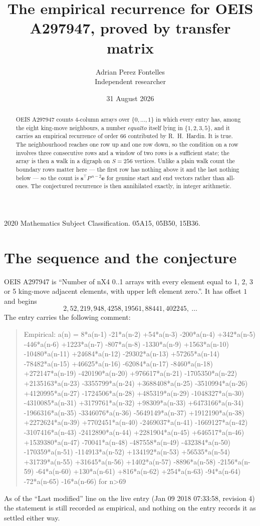 \documentclass[11pt,a4paper]{article}
\title{The empirical recurrence for OEIS A297947, proved by transfer matrix}
\author{Adrian Perez Fontelles\\ \small Independent researcher}
\date{31 August 2026}
\theoremstyle{plain}
\theoremstyle{definition}
\begin{document}
\maketitle

\begin{abstract}
OEIS A297947 counts $4$-column arrays over $\{0,\dots,1\}$ in which every entry has,
among the eight king-move neighbours, a number $equal to$ itself lying in $\{1,2,3,5\}$, and it carries an empirical
recurrence of order $66$ contributed by R.~H.~Hardin. It is true. The neighbourhood
reaches one row up and one row down, so the condition on a row involves three consecutive
rows and a window of two rows is a sufficient state; the array is then a walk in a digraph
on $S=256$ vertices. Unlike a plain walk count the boundary rows matter here --- the first
row has nothing above it and the last nothing below --- so the count is
$\mathbf{s}^{\!\top}P^{\,n-2}\mathbf{e}$ for genuine start and end vectors rather than
all-ones. The conjectured recurrence is then annihilated exactly, in integer arithmetic.
\end{abstract}

\noindent\small 2020 Mathematics Subject Classification. 05A15, 05B50, 15B36.\normalsize

\section{The sequence and the conjecture}

OEIS A297947 is ``Number of nX4 0..1 arrays with every element equal to 1, 2, 3 or 5 king-move adjacent elements, with upper left element zero.''. It has offset
$1$ and begins
\[
2, 52, 219, 948, 4258, 19561, 88441, 402245,\ \dots
\]
The entry carries the following comment:
\begin{quote}\small
Empirical: a(n) = 8*a(n-1) -21*a(n-2) +54*a(n-3) -200*a(n-4) +342*a(n-5) -446*a(n-6) +1223*a(n-7) -807*a(n-8) -1330*a(n-9) +1563*a(n-10) -10480*a(n-11) +24684*a(n-12) -29302*a(n-13) +57265*a(n-14) -78482*a(n-15) +46625*a(n-16) -62084*a(n-17) -8460*a(n-18) +272147*a(n-19) -420190*a(n-20) +976617*a(n-21) -1705350*a(n-22) +2135163*a(n-23) -3355799*a(n-24) +3688408*a(n-25) -3510994*a(n-26) +4120995*a(n-27) -1724506*a(n-28) +485319*a(n-29) -1048327*a(n-30) -4310085*a(n-31) +3179761*a(n-32) +98309*a(n-33) +6473166*a(n-34) -1966316*a(n-35) -3346076*a(n-36) -5649149*a(n-37) +1912190*a(n-38) +2272624*a(n-39) +7702451*a(n-40) -2469037*a(n-41) -1669127*a(n-42) -3107416*a(n-43) -2412890*a(n-44) +2281904*a(n-45) +646517*a(n-46) +1539380*a(n-47) -70041*a(n-48) -487558*a(n-49) -432384*a(n-50) -170359*a(n-51) -114913*a(n-52) +134192*a(n-53) +56535*a(n-54) +31739*a(n-55) +31645*a(n-56) +1402*a(n-57) -8896*a(n-58) -2156*a(n-59) -64*a(n-60) +130*a(n-61) +816*a(n-62) +254*a(n-63) -94*a(n-64) -72*a(n-65) -16*a(n-66) for n>69
\end{quote}
As of the ``Last modified'' line on the live entry (Jan 09 2018 07:33:58, revision
4) the statement is still recorded as empirical, and nothing on the entry
records it as settled either way.
\end{document}
